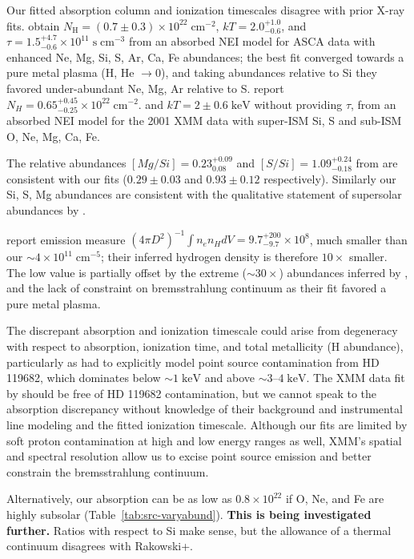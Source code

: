 \documentclass[preprint2,tighten,trackchanges]{aastex6}
\newcommand*{\mt}{\mathrm}
\newcommand*{\unit}[1]{\;\mt{#1}}  %
\newcommand*{\abt}{\mathord{\sim}} %
\newcommand*{\nH}{N_{\mathrm{H}}}
\newcommand*{\nHUnits}{\times 10^{22} \unit{cm^{-2}}}
\newcommand*{\kB}{k}  %
\begin{document}
Our fitted absorption column and ionization timescales disagree with prior
X-ray fits.
\citet{rakowski2001} obtain $\nH = (0.7 \pm 0.3) \nHUnits$,
$\kB T = 2.0^{+1.0}_{-0.6}$, and
$\tau = 1.5^{+4.7}_{-0.6} \times 10^{11} \unit{s\;cm^{-3}}$
from an absorbed NEI model for ASCA data with enhanced Ne, Mg, Si, S, Ar, Ca,
Fe abundances; the best fit converged towards a pure metal plasma
(H, He $\to 0$), and taking abundances relative to Si they favored
under-abundant Ne, Mg, Ar relative to S.
\citet{safi-harb2007} report $N_H = 0.65^{+0.45}_{-0.25} \nHUnits$.
and $\kB T = 2 \pm 0.6 \unit{keV}$ without providing $\tau$, from
an absorbed NEI model for the 2001 XMM data with
super-ISM Si, S and sub-ISM O, Ne, Mg, Ca, Fe.

The relative abundances $[Mg/Si] = 0.23^{+0.09}_{0.08}$ and $[S/Si] =
1.09^{+0.24}_{-0.18}$ from \citet{rakowski2001} are consistent with our fits
($0.29 \pm 0.03$ and $0.93 \pm 0.12$ respectively).  Similarly our Si, S, Mg
abundances are consistent with the qualitative statement of supersolar
abundances by \citet{safi-harb2007}.

\citet{rakowski2001} report emission measure
$(4\pi D^2)^{-1} \int n_e n_H dV = 9.7^{+200}_{-9.7} \times 10^8$, much smaller
than our $\abt 4 \times 10^{11} \unit{cm^{-5}}$; their inferred hydrogen
density is therefore $10\times$ smaller.
The low value is partially offset by the extreme ($\abt 30\times$) abundances
inferred by \citet{rakowski2001}, and the lack of constraint on bremsstrahlung
continuum as their fit favored a pure metal plasma.

The discrepant absorption and ionization timescale could arise from degeneracy
with respect to absorption, ionization time, and total metallicity (H
abundance), particularly as \citet{rakowski2001} had to explicitly model point
source contamination from HD 119682, which dominates
below $\abt 1 \unit{keV}$ and above $\abt 3$--$4 \unit{keV}$.
The XMM data fit by \citet{safi-harb2007} should be free of HD 119682
contamination, but we cannot speak to the absorption discrepancy without
knowledge of their background and instrumental line modeling and the fitted
ionization timescale.
Although our fits are limited by soft proton contamination at high and
low energy ranges as well, XMM's spatial and spectral resolution allow us to
excise point source emission and better constrain the bremsstrahlung continuum.

Alternatively, our absorption can be as low as $0.8 \times 10^{22}$ if
O, Ne, and Fe are highly subsolar (Table~\ref{tab:src-varyabund}).
\textbf{This is being investigated further.}
Ratios with respect to Si make sense, but the allowance of a thermal continuum
disagrees with Rakowski+.
\end{document}
